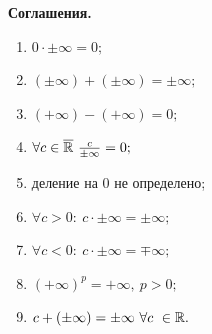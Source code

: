\noindent \textbf{Соглашения.}
\begin{enumerate}
    \item $0 \cdot \pm \infty = 0;$
    \item $(\pm \infty) + (\pm \infty) = \pm \infty;$
    \item $(+\infty) - (+\infty) = 0;$
    \item $\forall c \in \overline{\R} \ \frac{c}{\pm \infty} = 0;$
    \item деление на 0 не определено;
    \item $\forall c > 0: \ c \cdot \pm \infty = \pm \infty;$
    \item $\forall c < 0: \ c \cdot \pm \infty = \mp \infty;$
    \item $(+\infty)^p = +\infty, \ p > 0;$
    \item $c + (\pm \infty) = \pm \infty \ \forall c \
    \in \R.$
\end{enumerate}

